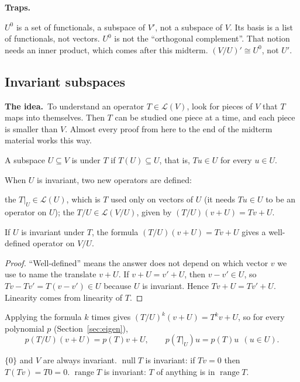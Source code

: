 \documentclass[10pt]{scrartcl}
\DeclareMathOperator{\nul}{null}
\DeclareMathOperator{\range}{range}
\newcommand{\LL}{\mathcal L}
\newcommand{\traps}{\par\medskip\noindent\textbf{\color{RawSienna}Traps.}\ }
\newcommand{\idea}{\par\noindent\textbf{\color{MidnightBlue}The idea.}\ }
\begin{document}
\traps
\begin{itemize}
  \ii $U^0$ is a set of functionals, a subspace of $V'$, not a subspace of $V$. Its basis is a list of functionals, not vectors.
  \ii $U^0$ is not the ``orthogonal complement''. That notion needs an inner product, which comes after this midterm.
  \ii $(V/U)'\cong U^0$, not $U'$.
\end{itemize}

\subsection{Invariant subspaces}\label{sec:invariant}
\idea To understand an operator $T\in\LL(V)$, look for pieces of $V$ that $T$ maps into themselves. Then $T$ can be studied one piece at a time, and each piece is smaller than $V$. Almost every proof from here to the end of the midterm material works this way.

\begin{definition*}
  A subspace $U\subseteq V$ is  under $T$ if $T(U)\subseteq U$, that is, $Tu\in U$ for every $u\in U$.
\end{definition*}
When $U$ is invariant, two new operators are defined:
\begin{itemize}
  \ii the  $T|_U\in\LL(U)$, which is $T$ used only on vectors of $U$ (it needs $Tu\in U$ to be an operator on $U$);
  \ii the  $T/U\in\LL(V/U)$, given by $(T/U)(v+U)=Tv+U$.
\end{itemize}

\begin{proposition*}
  If $U$ is invariant under $T$, the formula $(T/U)(v+U)=Tv+U$ gives a well-defined operator on $V/U$.
\end{proposition*}
\begin{proof}
  ``Well-defined'' means the answer does not depend on which vector $v$ we use to name the translate $v+U$. If $v+U=v'+U$, then $v-v'\in U$, so $Tv-Tv'=T(v-v')\in U$ because $U$ is invariant. Hence $Tv+U=Tv'+U$. Linearity comes from linearity of $T$.
\end{proof}
Applying the formula $k$ times gives $(T/U)^k(v+U)=T^kv+U$, so for every polynomial $p$ (Section~\ref{sec:eigen}),
\[ p(T/U)(v+U)=p(T)v+U,\qquad p(T|_U)u=p(T)u\ \ (u\in U). \]

\begin{example*}[Ex.~48]
  $\{0\}$ and $V$ are always invariant. $\nul T$ is invariant: if $Tv=0$ then $T(Tv)=T0=0$. $\range T$ is invariant: $T$ of anything is in $\range T$.
\end{example*}
\end{document}

